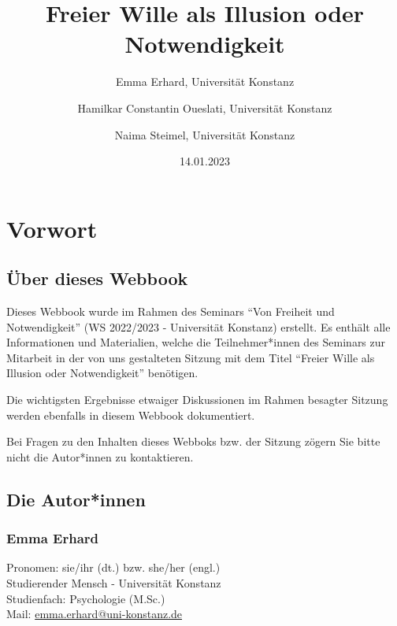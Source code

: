 \documentclass[
  a4paper,
]{report}
\title{Freier Wille als Illusion oder Notwendigkeit}
\author{Emma Erhard, Universität Konstanz \and Hamilkar Constantin Oueslati, Universität Konstanz \and Naima Steimel, Universität Konstanz}
\date{14.01.2023}
\begin{document}
\maketitle

\renewcommand*\contentsname{Inhaltsverzeichnis}
{
\hypersetup{linkcolor=}
\setcounter{tocdepth}{3}
\tableofcontents
}
\hypertarget{preface}{%
\chapter*{Vorwort}\label{preface}}

\hypertarget{about}{%
\section*{Über dieses Webbook}\label{about}}

Dieses Webbook wurde im Rahmen des Seminars ``Von Freiheit und Notwendigkeit'' (WS 2022/2023 - Universität Konstanz) erstellt. Es enthält alle Informationen und Materialien, welche die Teilnehmer*innen des Seminars zur Mitarbeit in der von uns gestalteten Sitzung mit dem Titel ``Freier Wille als Illusion oder Notwendigkeit'' benötigen.

Die wichtigsten Ergebnisse etwaiger Diskussionen im Rahmen besagter Sitzung werden ebenfalls in diesem Webbook dokumentiert.

Bei Fragen zu den Inhalten dieses Webboks bzw. der Sitzung zögern Sie bitte nicht die Autor*innen zu kontaktieren.

\hypertarget{authors}{%
\section*{Die Autor*innen}\label{authors}}

\hypertarget{eerhard}{%
\subsection*{Emma Erhard}\label{eerhard}}

Pronomen: sie/ihr (dt.) bzw. she/her (engl.)\\
Studierender Mensch - Universität Konstanz\\
Studienfach: Psychologie (M.Sc.)\\

Mail: \href{mailto:emma.erhard@uni-konstanz.de?subject=Freier\%20Wille\%20als\%20Illusion\%20oder\%20Notwendigkeit}{emma.erhard@uni-konstanz.de}
\end{document}

